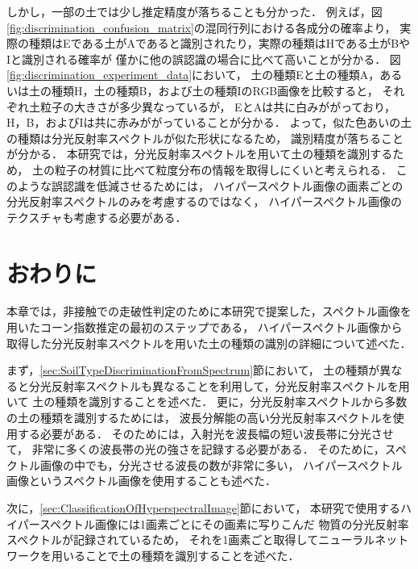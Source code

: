 しかし，一部の土では少し推定精度が落ちることも分かった．
例えば，図\ref{fig:discrimination_confusion_matrix}の混同行列における各成分の確率より，
実際の種類はEである土がAであると識別されたり，実際の種類はHである土がBやIと識別される確率が
僅かに他の誤認識の場合に比べて高いことが分かる．
図\ref{fig:discrimination_experiment_data}において，
土の種類Eと土の種類A，あるいは土の種類H，土の種類B，および土の種類IのRGB画像を比較すると，
それぞれ土粒子の大きさが多少異なっているが，
EとAは共に白みががっており，H，B，およびIは共に赤みががっていることが分かる．
よって，似た色あいの土の種類は分光反射率スペクトルが似た形状になるため，
識別精度が落ちることが分かる．
本研究では，分光反射率スペクトルを用いて土の種類を識別するため，
土の粒子の材質に比べて粒度分布の情報を取得しにくいと考えられる．
このような誤認識を低減させるためには，
ハイパースペクトル画像の画素ごとの分光反射率スペクトルのみを考慮するのではなく，
ハイパースペクトル画像のテクスチャも考慮する必要がある．

\newpage


%
\section{おわりに}

本章では，非接触での走破性判定のために本研究で提案した，スペクトル画像を用いたコーン指数推定の最初のステップである，
ハイパースペクトル画像から取得した分光反射率スペクトルを用いた土の種類の識別の詳細について述べた．

まず，\ref{sec:SoilTypeDiscriminationFromSpectrum}節において，
土の種類が異なると分光反射率スペクトルも異なることを利用して，分光反射率スペクトルを用いて
土の種類を識別することを述べた．
更に，分光反射率スペクトルから多数の土の種類を識別するためには，
波長分解能の高い分光反射率スペクトルを使用する必要がある．
そのためには，入射光を波長幅の短い波長帯に分光させて，
非常に多くの波長帯の光の強さを記録する必要がある．
そのために，スペクトル画像の中でも，分光させる波長の数が非常に多い，
ハイパースペクトル画像というスペクトル画像を使用することも述べた．

次に，\ref{sec:ClassificationOfHyperspectralImage}節において，
本研究で使用するハイパースペクトル画像には1画素ごとにその画素に写りこんだ
物質の分光反射率スペクトルが記録されているため，
それを1画素ごと取得してニューラルネットワークを用いることで土の種類を識別することを述べた．

